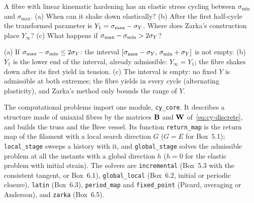 \label{exo:cy-q-zarka}
%
A fibre with linear kinematic hardening has an elastic stress cycling between
$\sigma_{\min}$ and $\sigma_{\max}$. (a) When can it shake down elastically?
(b) After the first half-cycle the transformed parameter is
$Y_1=\sigma_{\max}-\sigma_{Y}$. Where does Zarka's construction place $Y_\infty$?
(c) What happens if $\sigma_{\max}-\sigma_{\min}>2\sigma_{Y}$?
\begin{solution}
(a) If $\sigma_{\max}-\sigma_{\min}\le2\sigma_{Y}$: the interval
$[\sigma_{\max}-\sigma_{Y},\,\sigma_{\min}+\sigma_{Y}]$ is not empty. (b) $Y_1$ is the lower
end of the interval, already admissible: $Y_\infty=Y_1$; the fibre shakes down
after its first yield in tension. (c) The interval is empty: no fixed $Y$ is
admissible at both extremes; the fibre yields in every cycle (alternating
plasticity), and Zarka's method only bounds the range of $Y$.
\end{solution}

\label{sec:cy-aux}%
%
The computational problems import one module, \texttt{cy\_core}. It describes a
structure made of uniaxial fibres by the matrices $\mathbf{B}$ and $\mathbf{W}$
of~\eqref{eq:cy-discrete}, and builds the truss and the Bree vessel. Its
function \texttt{return\_map} is the return map of the filament with a local
search direction $G$ ($G=E$ for Box~5.1); \texttt{local\_stage} sweeps a
history with it, and \texttt{global\_stage} solves the admissible problem at
all the instants with a global direction $h$ ($h=0$ for the elastic
problem with initial strain). The solvers are \texttt{incremental} (Box~5.3
with the consistent tangent, or Box~6.1), \texttt{global\_local} (Box~6.2,
initial or periodic closure), \texttt{latin} (Box~6.3), \texttt{period\_map}
and \texttt{fixed\_point} (Picard, averaging or Anderson), and \texttt{zarka}
(Box~6.5).



